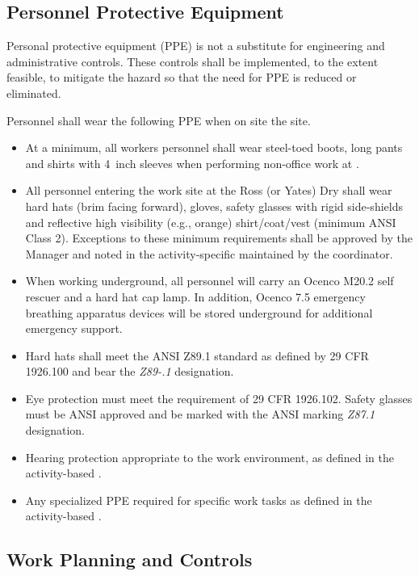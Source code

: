 \subsection{Personnel Protective Equipment}

Personal protective equipment (PPE) is not a substitute for
engineering and administrative controls. These controls shall be
implemented, to the extent feasible, to mitigate the hazard so that
the need for PPE is reduced or eliminated.

Personnel shall wear the following PPE when on site the  site.
\begin{itemize}
\item At a minimum, all workers personnel shall wear
  steel-toed boots, long pants and shirts with 4~inch sleeves when
  performing non-office work at . 
  \item All personnel entering the work site at the Ross (or Yates) Dry
    shall wear hard hats (brim facing forward), gloves,
    safety glasses with rigid side-shields and reflective high
    visibility (e.g., orange) shirt/coat/vest (minimum ANSI Class 2).
    Exceptions to these minimum requirements shall be approved by the
      Manager and noted in the
    activity-specific  maintained by the   coordinator.
  \item When working underground, all personnel will carry an Ocenco M20.2 self rescuer
    and a hard hat cap lamp. In addition, Ocenco 7.5 emergency breathing apparatus devices
    will be stored underground for additional emergency support.
  \item Hard hats shall meet the ANSI Z89.1 standard as defined by 29
    CFR 1926.100 and bear the {\em Z89-.1} designation.
   \item Eye protection must meet the requirement of 29 CFR
      1926.102. Safety glasses must be ANSI approved and be marked
      with the ANSI marking {\em Z87.1} designation.
    \item Hearing protection appropriate to the work environment, as
      defined in the activity-based .
    \item Any specialized PPE required for specific work tasks as
      defined in the activity-based . 
\end{itemize}

\subsection{Work Planning and Controls}

